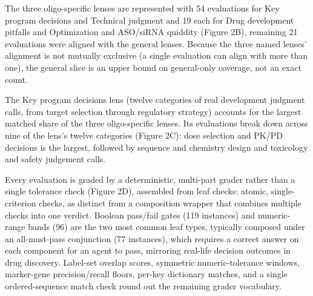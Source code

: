 \documentclass[11pt]{article}
\begin{document}
The three oligo-specific lenses are represented with 54 evaluations for Key program decisions and Technical judgment and 19 each for Drug development pitfalls and Optimization and ASO/siRNA quiddity (Figure 2B), remaining 21 evaluations were aligned with the general lenses. Because the three named lenses' alignment is not mutually exclusive (a single evaluation can align with more than one), the general slice is an upper bound on general-only coverage, not an exact count.

The Key program decisions lens (twelve categories of real development judgment calls, from target selection through regulatory strategy) accounts for the largest matched share of the three oligo-specific lenses. Its evaluations break down across nine of the lens's twelve categories (Figure 2C): dose selection and PK/PD decisions is the largest, followed by sequence and chemistry design and toxicology and safety judgement calls.

Every evaluation is graded by a deterministic, multi-part grader rather than a single tolerance check (Figure 2D), assembled from leaf checks: atomic, single-criterion checks, as distinct from a composition wrapper that combines multiple checks into one verdict. Boolean pass/fail gates (119 instances) and numeric-range bands (96) are the two most common leaf types, typically composed under an all-must-pass conjunction (77 instances), which requires a correct answer on each component for an agent to pass, mirroring real-life decision outcomes in drug discovery. Label-set overlap scores, symmetric numeric-tolerance windows, marker-gene precision/recall floors, per-key dictionary matches, and a single ordered-sequence match check round out the remaining grader vocabulary.
\end{document}
